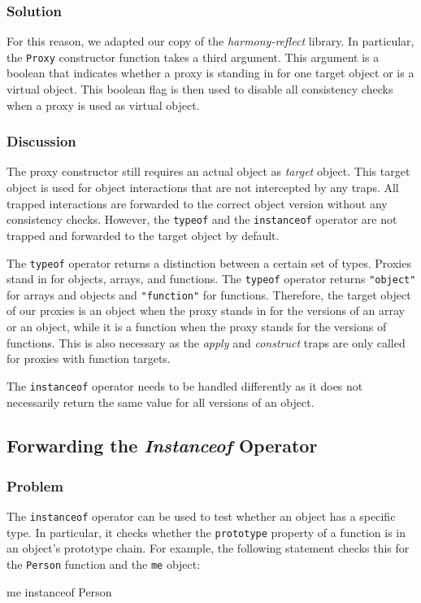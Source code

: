 \subsubsection{Solution}
For this reason, we adapted our copy of the \emph{harmony-reflect} library.
In particular, the \lstinline{Proxy} constructor function takes a third argument.
This argument is a boolean that indicates whether a proxy is standing in for one target object or is a virtual object.
This boolean flag is then used to disable all consistency checks when a proxy is used as virtual object.


\subsubsection{Discussion}

The proxy constructor still requires an actual object as \emph{target} object.
This target object is used for object interactions that are not intercepted by any traps.
All trapped interactions are forwarded to the correct object version without any consistency checks.
However, the \lstinline{typeof} and the \lstinline{instanceof} operator are not trapped and forwarded to the target object by default.

The \lstinline{typeof} operator returns a distinction between a certain set of types.
Proxies stand in for objects, arrays, and functions.
The \lstinline{typeof} operator returns \lstinline{"object"} for arrays and objects and \lstinline{"function"} for functions.
Therefore, the target object of our proxies is an object when the proxy stands in for the versions of an array or an object, while it is a function when the proxy stands for the versions of functions.
This is also necessary as the \emph{apply} and \emph{construct} traps are only called for proxies with function targets.

The \lstinline{instanceof} operator needs to be handled differently as it does not necessarily return the same value for all versions of an object.


\subsection{Forwarding the \emph{Instanceof} Operator}

\subsubsection{Problem}

The \lstinline{instanceof} operator can be used to test whether an object has a specific type.
In particular, it checks whether the \lstinline{prototype} property of a function is in an object's prototype chain.
For example, the following statement checks this for the \lstinline{Person} function and the \lstinline{me} object:

\begin{code}{}{}
me instanceof Person
\end{code}
\iffalse
\end{verbatim}\fi

